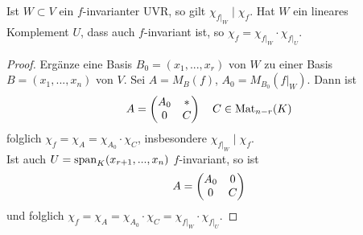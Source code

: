 \begin{lemma}
	Ist $W\subset V$ ein $f$-invarianter UVR, so gilt $\chi_{f\vert_W}\mid \chi_f$. Hat $W$ ein lineares Komplement $U$, dass auch $f$-invariant ist, so $\chi_f=\chi_{f\vert_W}\cdot \chi_{f\vert_U}$.
\end{lemma}
\begin{proof}
	Ergänze eine Basis $B_0=(x_1,...,x_r)$ von $W$ zu einer Basis $B=(x_1,...,x_n)$ von $V$. Sei $A=M_B(f)$, $A_0=M_{B_0}(f\vert_W)$. Dann ist 
	\begin{align}
		A=\begin{pmatrix}A_0&*\\0&C\end{pmatrix}\quad C\in\operatorname{Mat}_{n-r}(K)\notag
	\end{align}
	folglich $\chi_f=\chi_A=\chi_{A_0}\cdot \chi_C$, insbesondere $\chi_{f\vert_W}\mid\chi_f$.\\
	Ist auch $U=\operatorname{span}_K(x_{r+1},...,x_n)$ $f$-invariant, so ist 
	\begin{align}
		A=\begin{pmatrix}A_0&0\\0&C\end{pmatrix}\notag
	\end{align}
	und folglich $\chi_f=\chi_A=\chi_{A_0}\cdot\chi_C=\chi_{f\vert_W}\cdot\chi_{f\vert_U}$.
\end{proof}

